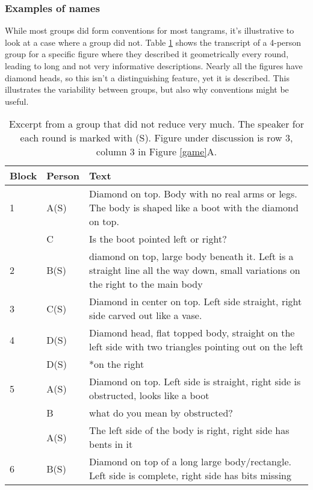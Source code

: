 \documentclass[
  english,
  a4paper,
]{article}
\begin{document}
\hypertarget{examples-of-names}{%
\subsubsection{Examples of names}\label{examples-of-names}}

While most groups did form conventions for most tangrams, it's illustrative to look at a case where a group did not. Table \ref{diamond} shows the transcript of a 4-person group for a specific figure where they described it geometrically every round, leading to long and not very informative descriptions. Nearly all the figures have diamond heads, so this isn't a distinguishing feature, yet it is described. This illustrates the variability between groups, but also why conventions might be useful.

\begin{table}[H]

\caption{\label{tab:diamond}Excerpt from a group that did not reduce very much. The speaker for each round is marked with (S). Figure under discussion is row 3, column 3 in Figure \ref{game}A.\label{diamond}}
\centering
\begin{tabular}[t]{ll>{\raggedright\arraybackslash}p{16em}}
\toprule
Block & Person & Text\\
\midrule
1 & A(S) & Diamond on top. Body with no real arms or legs. The body is shaped like a boot with the diamond on top.\\
 & C & Is the boot pointed left or right?\\
2 & B(S) & diamond on top, large body beneath it. Left is a straight line all the way down, small variations on the right to the main body\\
3 & C(S) & Diamond in center on top. Left side straight, right side carved out like a vase.\\
4 & D(S) & Diamond head, flat topped body, straight on the left side with two triangles pointing out on the left\\
 & D(S) & *on the right\\
5 & A(S) & Diamond on top. Left side is straight, right side is obstructed, looks like a boot\\
 & B & what do you mean by obstructed?\\
 & A(S) & The left side of the body is right, right side has bents in it\\
6 & B(S) & Diamond on top of a long large body/rectangle. Left side is complete, right side has bits missing\\
\bottomrule
\end{tabular}
\end{table}
\end{document}
